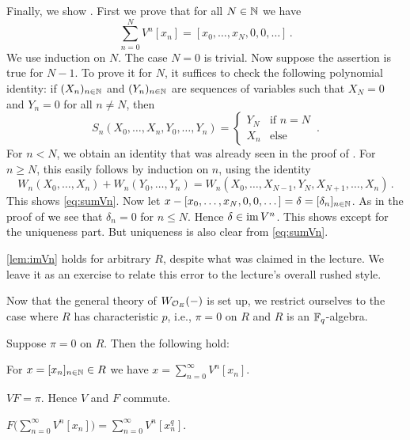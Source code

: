 \begin{proof*}
	Finally, we show . First we prove that for all $N\in \mathbb{N}$ we have
	\begin{equation}\label{eq:sumVn}
		\sum_{n=0}^NV^n[x_n]=[x_0,\dotsc,x_N,0,0,\dotsc]\,.
	\end{equation}
	We use induction on $N$. The case $N=0$ is trivial. Now suppose the assertion is true for $N-1$. To prove it for $N$, it suffices to check the following polynomial identity: if $(X_n)_{n\in\mathbb{N}}$ and $(Y_n)_{n\in\mathbb{N}}$ are sequences of variables such that $X_N=0$ and $Y_n=0$ for all $n\neq N$, then
	\begin{equation*}
		S_n(X_0,\dotsc,X_n,Y_0,\dotsc,Y_n)=\begin{cases}
		Y_N&\text{if }n= N\\
		X_n&\text{else}
		\end{cases}\,.
	\end{equation*}
	For $n<N$, we obtain an identity that was already seen in the proof of . For $n\geq N$, this easily follows by induction on $n$, using the identity
	\begin{equation*}
		W_n(X_0,\dotsc,X_n)+W_n(Y_0,\dotsc,Y_n)=W_n(X_0,\dotsc,X_{N-1},Y_N,X_{N+1},\dotsc,X_n)\,.
	\end{equation*}
	This shows \cref{eq:sumVn}. Now let $x-[x_0,\dotsc,x_N,0,0,\dotsc]=\delta=[\delta_n]_{n\in\mathbb{N}}$. As in the proof of  we see that $\delta_n=0$ for $n\leq N$. Hence $\delta\in\operatorname{im} V^n$. This shows  except for the uniqueness part. But uniqueness is also clear from \cref{eq:sumVn}.
\end{proof*}
\begin{urem*}
	\cref{lem:imVn} holds for arbitrary $R$, despite what was claimed in the lecture. We leave it as an exercise to relate this error to the lecture's overall rushed style.
\end{urem*}
Now that the general theory of $W_{\mathcal{O}_E}(-)$ is set up, we restrict ourselves to the case where $R$ has characteristic $p$, i.e., $\pi=0$ on $R$ and $R$ is an $\mathbb{F}_q$-algebra.
\begin{lem}\label{lem:Vincharp}
	Suppose $\pi=0$ on $R$. Then the following hold:
	\begin{numerate}
		\item For $x=[x_n]_{n\in\mathbb{N}}\in R$ we have $x=\sum_{n=0}^\infty V^n[x_n]$.
		\item $VF=\pi$. Hence $V$ and $F$ commute.
		\item $F\big(\sum_{n=0}^\infty V^n[x_n]\big)=\sum_{n=0}^\infty V^n[x_n^q]$.
	\end{numerate}
\end{lem}
